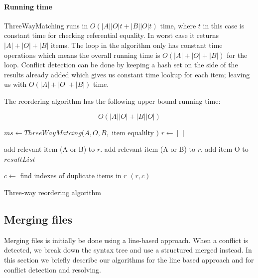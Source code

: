 \documentclass[11pt]{article}
\begin{document}
\paragraph{Running time} ThreeWayMatching runs in $O(|A||O| t + |B||O| t)$ time, where $t$ in this case is constant time for checking referential equality. In worst case it returns $|A|+|O|+|B|$ items. The loop in the algorithm only has constant time operations which means the overall running time is $O(|A|+|O|+|B|)$ for the loop. Conflict detection can be done by keeping a hash set on the side of the results already added which gives us constant time lookup for each item; leaving us with $O(|A|+|O|+|B|)$ time.

The reordering algorithm has the following upper bound running time:

\begin{equation}
O(|A||O| + |B||O|) \nonumber
\end{equation}

\begin{algorithm}
\begin{algorithmic}
   \State $ms \gets ThreeWayMatcing(A, O, B, $ item equalilty $)$
   \State $r \gets [\,]$
   
         \State add relevant item (A or B) to $r$.
      \EndIf
         \State add relevant item (A or B) to $r$.
      \EndIf
         \State add item O to $resultList$
      \EndIf
      
	\EndFor
	\State $c \gets$ find indexes of duplicate items in $r$
	\State \Return $(r, c)$
\EndFunction
\end{algorithmic}
\caption{Three-way reordering algorithm}
  \label{ThreeWayReorderingAlgorithm}
\end{algorithm}

\subsection{Merging files}

\label{MergingFiles}

Merging files is initially be done using a line-based approach. When a conflict is detected, we break down the syntax tree and use a structured merged instead. In this section we briefly describe our algorithms for the line based approach and for conflict detection and resolving.
\end{document}
